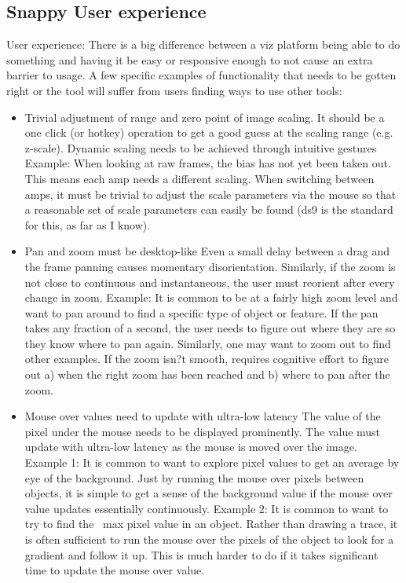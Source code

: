 \subsection{Snappy User experience}
User experience:
There is a big difference between a viz platform being able to do something and having it be easy or responsive enough to not cause an extra barrier to usage.  A few specific examples of functionality that needs to be gotten right or the tool will suffer from users finding ways to use other tools:
\begin{itemize}

\item{Trivial adjustment of range and zero point of image scaling.
It should be a one click (or hotkey) operation to get a good guess at the scaling range (e.g. z-scale).
Dynamic scaling needs to be achieved through intuitive gestures
Example: When looking at raw frames, the bias has not yet been taken out.  This means each amp needs a different scaling.  When switching between amps, it must be trivial to adjust the scale parameters via the mouse so that a reasonable set of scale parameters can easily be found (ds9 is the standard for this, as far as I know).}
\item{Pan and zoom must be desktop-like
Even a small delay between a drag and the frame panning causes momentary disorientation.
Similarly, if the zoom is not close to continuous and instantaneous, the user must reorient after every change in zoom.
Example: It is common to be at a fairly high zoom level and want to pan around to find a specific type of object or feature.  If the pan takes any fraction of a second, the user needs to figure out where they are so they know where to pan again.  Similarly, one may want to zoom out to find other examples.  If the zoom isn?t smooth, requires cognitive effort to figure out a) when the right zoom has been reached and b) where to pan after the zoom.}
\item{Mouse over values need to update with ultra-low latency
The value of the pixel under the mouse needs to be displayed prominently.
The value must update with ultra-low latency  as the mouse is moved over the image.
Example 1: It is common to want to explore pixel values to get an average by eye of the background.  Just by running the mouse over pixels between objects, it is simple to get a sense of the background value if the mouse over value updates essentially continuously.
Example 2: It is common to want to try to find the ~max pixel value in an object.  Rather than drawing a trace, it is often sufficient to run the mouse over the pixels of the object to look for a gradient and follow it up.  This is much harder to do if it takes significant time to update the mouse over value.
}
\end{itemize}
